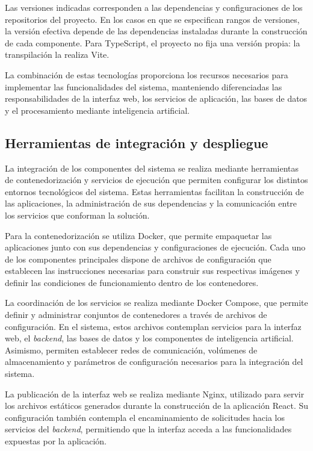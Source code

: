 Las versiones indicadas corresponden a las dependencias y
configuraciones de los repositorios del proyecto.
En los casos en que se especifican rangos de versiones, la
versión efectiva depende de las dependencias instaladas durante
la construcción de cada componente. Para TypeScript, el proyecto no fija una
versión propia: la transpilación la realiza Vite.

La combinación de estas tecnologías proporciona los recursos
necesarios para implementar las funcionalidades del sistema,
manteniendo diferenciadas las responsabilidades de la interfaz
web, los servicios de aplicación, las bases de datos y el
procesamiento mediante inteligencia artificial.


\subsection{Herramientas de integración y despliegue}

La integración de los componentes del sistema se realiza mediante
herramientas de contenedorización y servicios de ejecución que
permiten configurar los distintos entornos tecnológicos del
sistema. Estas herramientas facilitan la construcción de las
aplicaciones, la administración de sus dependencias y la
comunicación entre los servicios que conforman la solución.

Para la contenedorización se utiliza Docker, que permite
empaquetar las aplicaciones junto con sus dependencias y
configuraciones de ejecución. Cada uno de los componentes
principales dispone de archivos de configuración que establecen
las instrucciones necesarias para construir sus respectivas
imágenes y definir las condiciones de funcionamiento dentro
de los contenedores.

La coordinación de los servicios se realiza mediante Docker
Compose, que permite definir y administrar conjuntos de
contenedores a través de archivos de configuración. En el sistema,
estos archivos contemplan servicios para la interfaz web, el
\textit{backend}, las bases de datos y los componentes de inteligencia
artificial. Asimismo, permiten establecer redes de comunicación,
volúmenes de almacenamiento y parámetros de configuración
necesarios para la integración del sistema.

La publicación de la interfaz web se realiza mediante Nginx,
utilizado para servir los archivos estáticos generados durante
la construcción de la aplicación React. Su configuración
también contempla el encaminamiento de solicitudes hacia los
servicios del \textit{backend}, permitiendo que la interfaz acceda a
las funcionalidades expuestas por la aplicación.

